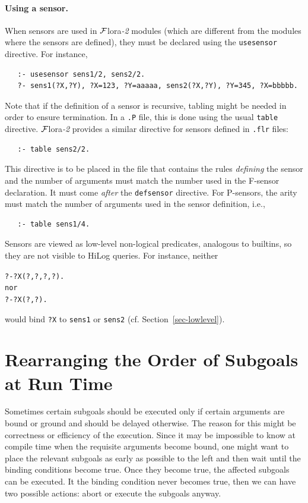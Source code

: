 \documentclass[11pt]{article}
\newcommand{\FLORA}{{\mbox{\sc ${\cal F}${lora}\rm\emph{-2}}}\xspace}
\begin{document}
\paragraph{Using a sensor.}
When sensors are
used in \FLORA modules (which are different from the modules where the
sensors are defined), they must be declared using the
\texttt{usesensor} directive.  For instance,
\begin{verbatim}
   :- usesensor sens1/2, sens2/2.
   ?- sens1(?X,?Y), ?X=123, ?Y=aaaaa, sens2(?X,?Y), ?Y=345, ?X=bbbbb.
\end{verbatim}

Note that if the definition of a sensor is recursive, tabling might be
needed in order to ensure termination. In a \texttt{.P} file, this is done
using the usual \texttt{table} directive. \FLORA provides a similar
directive for sensors defined in \texttt{.flr} files:
\begin{verbatim}
   :- table sens2/2.
\end{verbatim}
This directive is to be placed in the file that contains the rules \emph{defining}
the sensor and the number of arguments must match the number used in the
F-sensor declaration.
It must come \emph{after} the \texttt{defsensor} directive.  
For P-sensors, the arity must match the number of arguments used in the
sensor definition, i.e.,
\begin{verbatim}
   :- table sens1/4.
\end{verbatim}


Sensors are viewed as low-level non-logical predicates, analogous to
builtins, so
they are not visible to HiLog queries. For instance, neither
\begin{alltt}
   ?- ?X(?,?,?,?).
\textnormal{nor}
   ?- ?X(?,?).
\end{alltt}
would bind \texttt{?X}  to \texttt{sens1} or \texttt{sens2}
(cf. Section~\ref{sec-lowlevel}).

  
\section{Rearranging the Order of Subgoals at Run Time}
\label{sev-rearanging}

Sometimes certain subgoals should be executed only if certain arguments are
bound or ground and should be delayed otherwise.
The reason for this might be correctness or efficiency of the execution.
Since it may be impossible to know at compile time when the requisite
arguments become bound, one might want to place the relevant subgoals as
early as possible to the left and then wait until the binding conditions
become true. Once they become true, the affected subgoals can be
executed. It the binding condition never becomes true, then we can have two
possible actions: abort or execute the subgoals anyway.
\end{document}
